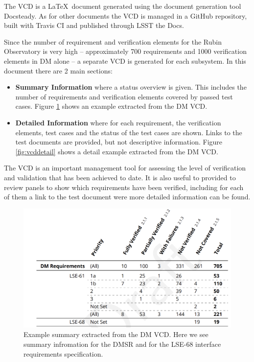 The VCD is a \LaTeX~document generated using the document generation tool Docsteady.
As for other documents the VCD is managed in a GitHub repository, built with Travis CI and published through LSST the Docs.

Since the number of requirement and verification elements for the Rubin Observatory is very high --
approximately 700 requirements and 1000 verification elements in DM alone -- a separate VCD is generated for each subsystem.
In this document there are 2 main sections:

\begin{itemize}
\item \textbf{Summary Information} where a status overview is given.
This includes the number of requirements and verification elements covered by passed test cases.
Figure \ref{fig:vcdsum} shows an example extracted from the DM VCD.
\item \textbf{Detailed Information} where for each requirement, the verification elements, test cases
and the status of the test cases are shown. Links to the test documents are provided, but not descriptive information.
Figure \ref{fig:vcddetail} shows a detail example extracted from the DM VCD.
\end{itemize}

The VCD is an important management tool for assessing the  level of verification and validation that has been achieved to date.
 It is also useful to provided to review panels to show which requirements have been verified, 
 including for each of them a link to the test document were more detailed information can be found.

\begin{figure}
\begin{center}
\includegraphics[width=\textwidth]{imgs/VCDsumm.png}
 \caption{Example summary extracted from the DM VCD. 
 Here we see summary infromation for the DMSR \cite{LSE-61} and for the LSE-68 interface requirements specification\cite{LSE-68}.}
 \label{fig:vcdsum}
\end{center}
\end{figure}

